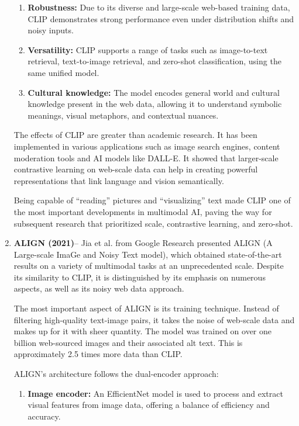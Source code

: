 \documentclass[conference]{IEEEtran}
\begin{document}
\begin{enumerate}
\begin{enumerate}
    \item \textbf{Robustness:} Due to its diverse and large-scale web-based training data, CLIP demonstrates strong performance even under distribution shifts and noisy inputs.
    
    \item \textbf{Versatility:} CLIP supports a range of tasks such as image-to-text retrieval, text-to-image retrieval, and zero-shot classification, using the same unified model.
    
    \item \textbf{Cultural knowledge:} The model encodes general world and cultural knowledge present in the web data, allowing it to understand symbolic meanings, visual metaphors, and contextual nuances.
\end{enumerate}

The effects of CLIP are greater than academic research. It has been implemented in various applications such as image search engines, content moderation tools and AI models like DALL-E. It showed that larger-scale contrastive learning on web-scale data can help in creating powerful representations that link language and vision semantically.

Being capable of “reading” pictures and “visualizing” text made CLIP one of the most important developments in multimodal AI, paving the way for subsequent research that prioritized scale, contrastive learning, and zero-shot.

\item \textbf{ALIGN (2021)}– Jia et al. \cite{jia2021scaling} from Google Research presented ALIGN (A Large-scale ImaGe and Noisy Text model), which obtained state-of-the-art results on a variety of multimodal tasks at an unprecedented scale. Despite its similarity to CLIP, it is distinguished by its emphasis on numerous aspects, as well as its noisy web data approach.

The most important aspect of ALIGN is its training technique. Instead of filtering high-quality text-image pairs, it takes the noise of web-scale data and makes up for it with sheer quantity. The model was trained on over one billion web-sourced images and their associated alt text. This is approximately 2.5 times more data than CLIP.

ALIGN's architecture follows the dual-encoder approach:
\begin{enumerate}
    \item \textbf{Image encoder:} An EfficientNet model is used to process and extract visual features from image data, offering a balance of efficiency and accuracy.
    

\end{enumerate}
\end{enumerate}
\end{document}
